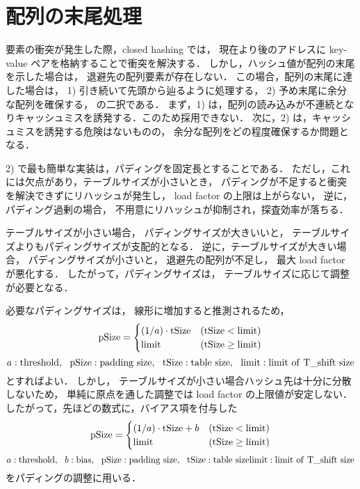 \section{配列の末尾処理}

要素の衝突が発生した際，closed hashing では，
現在より後のアドレスに key-value ペアを格納することで衝突を解決する．
しかし，ハッシュ値が配列の末尾を示した場合は，
退避先の配列要素が存在しない．
この場合，配列の末尾に達した場合は，
1) 引き続いて先頭から辿るように処理する，
2) 予め末尾に余分な配列を確保する，
の二択である．
まず，1) は，配列の読み込みが不連続となりキャッシュミスを誘発する．このため採用できない．
次に，2) は，キャッシュミスを誘発する危険はないものの，
余分な配列をどの程度確保するか問題となる．

2) で最も簡単な実装は，パディングを固定長とすることである．
ただし，これには欠点があり，テーブルサイズが小さいとき，
パディングが不足すると衝突を解決できずにリハッシュが発生し，
load factor の上限は上がらない，
逆に，パディング過剰の場合，
不用意にリハッシュが抑制され，探査効率が落ちる．

テーブルサイズが小さい場合，
パディングサイズが大きいいと，
テーブルサイズよりもパディングサイズが支配的となる．
逆に，テーブルサイズが大きい場合，
パディングサイズが小さいと，
退避先の配列が不足し，
最大 load factor が悪化する．
したがって，パディングサイズは，
テーブルサイズに応じて調整が必要となる．

必要なパディングサイズは，
線形に増加すると推測されるため，
\[
  {\rm pSize} = \begin{cases}
    (1/a) \cdot {\rm tSize} & ({\rm tSize}<{\rm limit}) \\
    {\rm limit}    & ({\rm tSize}\geq{\rm limit})
  \end{cases}
\]
\[
  a: {\rm threshold}, \ \ 
  {\rm pSize}: {\rm padding \ size}, \ \ 
  {\rm tSize}: {\rm table \ size}, \ \ 
  {\rm limit}: {\rm limit \ of \ T\_shift \ size}
\]
とすればよい．
しかし，
テーブルサイズが小さい場合ハッシュ先は十分に分散しないため，
単純に原点を通した調整では load factor の上限値が安定しない．
したがって，先ほどの数式に，バイアス項を付与した
\[
  {\rm pSize} = \begin{cases}
    (1/a) \cdot {\rm tSize} + b & ({\rm tSize}<{\rm limit}) \\
    {\rm limit}    & ({\rm tSize}\geq{\rm limit})
  \end{cases}
\]
\[
  a: {\rm threshold}, \ \ 
  b: {\rm bias}, \ \ 
  {\rm pSize}: {\rm padding \ size}, \ \ 
  {\rm tSize}: {\rm table \ size}
  {\rm limit}: {\rm limit \ of \ T\_shift \ size}
\]
をパディングの調整に用いる．

